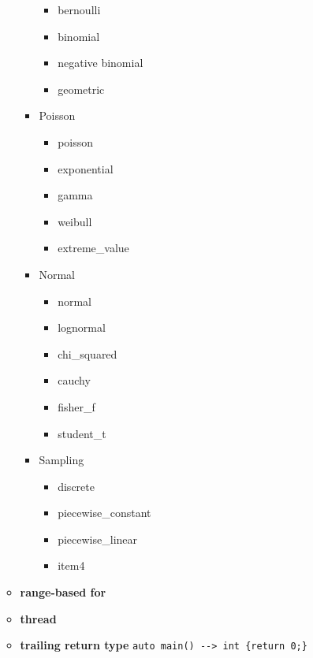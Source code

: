 \documentclass{article}
\begin{document}
\begin{itemize}
\begin{itemize}
\begin{itemize}
                \begin{itemize}
                  \item bernoulli
                  \item binomial
                  \item negative binomial
                  \item geometric
                \end{itemize}
              \item Poisson
                \begin{itemize}
                  \item poisson
                  \item exponential
                  \item gamma
                  \item weibull
                  \item extreme\_value
                \end{itemize}
              \item Normal
                \begin{itemize}
                  \item normal
                  \item lognormal
                  \item chi\_squared
                  \item cauchy
                  \item fisher\_f
                  \item student\_t
                \end{itemize}
              \item Sampling
                \begin{itemize}
                  \item discrete
                  \item piecewise\_constant
                  \item piecewise\_linear
                  \item item4
                \end{itemize}
            \end{itemize}
          \item \textbf{range-based for}
          \item \textbf{thread}
          \item \textbf{trailing return type}
            \verb!auto main() --> int {return 0;}!
        \end{itemize}

\end{itemize}
\end{document}
